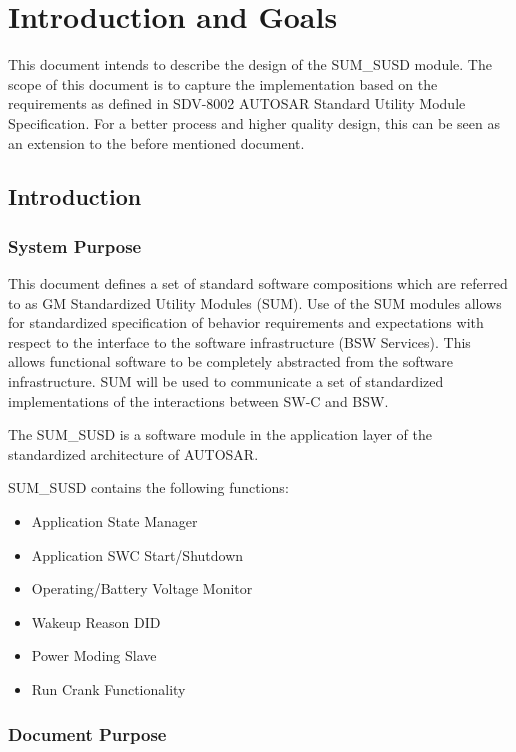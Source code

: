\chapter{Introduction and Goals}

This document intends to describe the design of the SUM_SUSD module.
The scope of this document is to capture the implementation based on the requirements as defined in SDV-8002 AUTOSAR Standard Utility Module Specification.
For a better process and higher quality design, this can be seen as an extension to the before mentioned document.

\section{Introduction}

\subsection{System Purpose}

This document defines a set of standard software compositions which are referred to as GM Standardized Utility Modules (SUM).
Use of the SUM modules allows for standardized specification of behavior requirements and expectations with respect to the interface to the software infrastructure (BSW Services).
This allows functional software to be completely abstracted from the software infrastructure.
SUM will be used to communicate a set of standardized implementations of the interactions between SW-C and BSW.

The SUM_SUSD is a software module in the application layer of the standardized architecture of AUTOSAR.

SUM_SUSD contains the following functions:

\begin{itemize}
	\item Application State Manager
	\item Application SWC Start/Shutdown
	\item Operating/Battery Voltage Monitor
	\item Wakeup Reason DID
	\item Power Moding Slave
	\item Run Crank Functionality
\end{itemize}

\subsection{Document Purpose}

